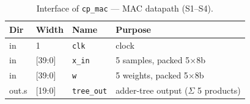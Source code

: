 %

\begin{table}[t]
\centering
\caption{Interface of \texttt{cp\_mac} — MAC datapath (S1--S4).}
\label{tab:if-cp-mac}
\small
\setlength{\tabcolsep}{4pt}
\renewcommand{\arraystretch}{1.1}
\begin{tabular}{@{}llll@{}}
\toprule
\textbf{Dir} & \textbf{Width} & \textbf{Name} & \textbf{Purpose} \\
\midrule
in    & 1        & \texttt{clk}      & clock \\
in    & [39:0]   & \texttt{x\_in}    & 5 samples, packed 5$\times$8b \\
in    & [39:0]   & \texttt{w}        & 5 weights, packed 5$\times$8b \\
out.s & [19:0]   & \texttt{tree\_out}& adder-tree output ($\Sigma$ 5 products) \\
\bottomrule
\end{tabular}
\end{table}

